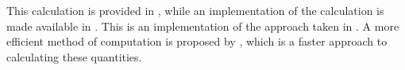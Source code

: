 %
%
%





This calculation is provided in \citet{hanleymcneil1982}, while an implementation of the calculation is made available in \citet{proc2011}.
This is an implementation of the approach taken in \citet{delong1988}.
%
A more efficient method of computation is proposed by \citet{sunxu2014}, which is a faster approach to calculating
these quantities.
%






